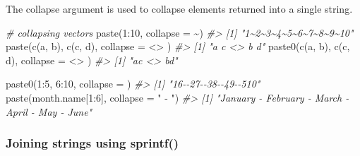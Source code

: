 \documentclass[
]{book}
\newenvironment{Shaded}{\begin{snugshade}}{\end{snugshade}}
\newcommand{\AttributeTok}[1]{\textcolor[rgb]{0.77,0.63,0.00}{#1}}
\newcommand{\CommentTok}[1]{\textcolor[rgb]{0.56,0.35,0.01}{\textit{#1}}}
\newcommand{\DecValTok}[1]{\textcolor[rgb]{0.00,0.00,0.81}{#1}}
\newcommand{\FunctionTok}[1]{\textcolor[rgb]{0.00,0.00,0.00}{#1}}
\newcommand{\NormalTok}[1]{#1}
\newcommand{\SpecialCharTok}[1]{\textcolor[rgb]{0.00,0.00,0.00}{#1}}
\newcommand{\StringTok}[1]{\textcolor[rgb]{0.31,0.60,0.02}{#1}}
\begin{document}
The collapse argument is used to collapse elements returned into a single string.

\begin{Shaded}
\begin{Highlighting}[]
\CommentTok{\# collapsing vectors}
\FunctionTok{paste}\NormalTok{(}\DecValTok{1}\SpecialCharTok{:}\DecValTok{10}\NormalTok{, }\AttributeTok{collapse =} \StringTok{\textquotesingle{}\textasciitilde{}\textquotesingle{}}\NormalTok{)}
\CommentTok{\#\textgreater{} [1] "1\textasciitilde{}2\textasciitilde{}3\textasciitilde{}4\textasciitilde{}5\textasciitilde{}6\textasciitilde{}7\textasciitilde{}8\textasciitilde{}9\textasciitilde{}10"}
\FunctionTok{paste}\NormalTok{(}\FunctionTok{c}\NormalTok{(}\StringTok{\textquotesingle{}a\textquotesingle{}}\NormalTok{, }\StringTok{\textquotesingle{}b\textquotesingle{}}\NormalTok{), }\FunctionTok{c}\NormalTok{(}\StringTok{\textquotesingle{}c\textquotesingle{}}\NormalTok{, }\StringTok{\textquotesingle{}d\textquotesingle{}}\NormalTok{), }\AttributeTok{collapse =} \StringTok{\textquotesingle{} \textless{}\textgreater{} \textquotesingle{}}\NormalTok{)}
\CommentTok{\#\textgreater{} [1] "a c \textless{}\textgreater{} b d"}
\FunctionTok{paste0}\NormalTok{(}\FunctionTok{c}\NormalTok{(}\StringTok{\textquotesingle{}a\textquotesingle{}}\NormalTok{, }\StringTok{\textquotesingle{}b\textquotesingle{}}\NormalTok{), }\FunctionTok{c}\NormalTok{(}\StringTok{\textquotesingle{}c\textquotesingle{}}\NormalTok{, }\StringTok{\textquotesingle{}d\textquotesingle{}}\NormalTok{), }\AttributeTok{collapse =} \StringTok{\textquotesingle{} \textless{}\textgreater{} \textquotesingle{}}\NormalTok{)}
\CommentTok{\#\textgreater{} [1] "ac \textless{}\textgreater{} bd"}

\FunctionTok{paste0}\NormalTok{(}\DecValTok{1}\SpecialCharTok{:}\DecValTok{5}\NormalTok{, }\DecValTok{6}\SpecialCharTok{:}\DecValTok{10}\NormalTok{, }\AttributeTok{collapse =} \StringTok{\textquotesingle{}{-}{-}\textquotesingle{}}\NormalTok{)}
\CommentTok{\#\textgreater{} [1] "16{-}{-}27{-}{-}38{-}{-}49{-}{-}510"}
\FunctionTok{paste}\NormalTok{(month.name[}\DecValTok{1}\SpecialCharTok{:}\DecValTok{6}\NormalTok{], }\AttributeTok{collapse =} \StringTok{" {-} "}\NormalTok{)}
\CommentTok{\#\textgreater{} [1] "January {-} February {-} March {-} April {-} May {-} June"}
\end{Highlighting}
\end{Shaded}

\hypertarget{joining-strings-using-sprintf}{%
\subsubsection{Joining strings using sprintf()}\label{joining-strings-using-sprintf}}
\end{document}
